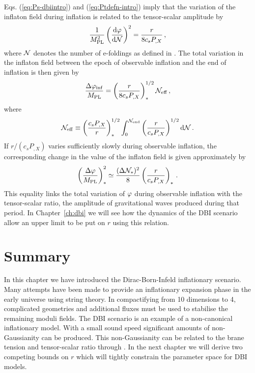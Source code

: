 Eqs. (\ref{eq:Ps-dbiintro}) and (\ref{eq:Ptdefn-intro}) imply 
that the variation of the inflaton field during inflation  
is related to the tensor-scalar amplitude by \cite{lyth,bmpaper}
% 
\begin{equation}
\label{eq:genlyth-dbiintro}
\frac{1}{M_{\mathrm{PL}}^2}
\left( \frac{\mathrm{d} \varphi}{\mathrm{d} \mathcal{N}} \right)^2 = \frac{r}{8 c_s P_{,X}}
\,,
\end{equation}
% 
where $\mathcal{N}$ denotes the number of e-foldings as defined in
.
The total variation in the inflaton field between the epoch of observable 
inflation and the end of inflation is then given by
% 
\begin{equation}
\label{eq:totalfield-dbiintro}
\frac{\Delta \varphi_{\rm inf}}{M_{\mathrm{PL}}} = 
\left( \frac{r}{8 c_s P_{,X}} \right)_*^{1/2} \mathcal{N}_\mathrm{eff} \,,
\end{equation}
% 
where
% 
\begin{equation}
\label{eq:Neff-dbiintro}
\mathcal{N}_\mathrm{eff} \equiv \left( \frac{c_sP_{,X}}{r}\right)_*^{1/2}
\int_0^{\mathcal{N}_{\rm end}}  
\left( \frac{r}{c_sP_{,X}} \right)^{1/2} \mathrm{d} \mathcal{N} \,.
\end{equation}
% 
If $r/(c_s P_{,X})$ varies 
sufficiently slowly during observable inflation, 
the corresponding change in the value of the inflaton  
field is given approximately by \cite{lyth,bmpaper}
% 
\begin{equation}
\label{eq:approxlyth-dbiintro}
\left( \frac{\Delta \varphi}{M_{\mathrm{PL}}} \right)_*^2 \simeq 
\frac{(\Delta \mathcal{N}_*)^2}{8} \left( \frac{r}{c_sP_{,X}} \right)_* \,.
\end{equation}
% 
This equality links the total variation of $\varphi$ during observable inflation
with the tensor-scalar ratio, \ie the amplitude of gravitational waves produced
during that period. In Chapter~\ref{ch:dbi} we will see how the dynamics of the
DBI scenario allow an upper limit to be put on $r$ using this relation.

\section{Summary}
\label{sec:summary-dbiintro}
In this chapter we have introduced the Dirac-Born-Infeld inflationary scenario.
Many attempts have been made to provide an inflationary expansion phase in the
early universe using string theory. In compactifying from 10 dimensions to 4,
complicated geometries and additional fluxes must be used to stabilise the
remaining moduli fields. 
The DBI scenario is an example of a non-canonical inflationary model. With a
small sound speed significant amounts of non-Gaussianity can be produced. This
non-Gaussianity can be related to the brane tension and tensor-scalar ratio
through . In the next chapter we will derive two
competing bounds on $r$ which will tightly constrain the parameter space for
DBI models.

